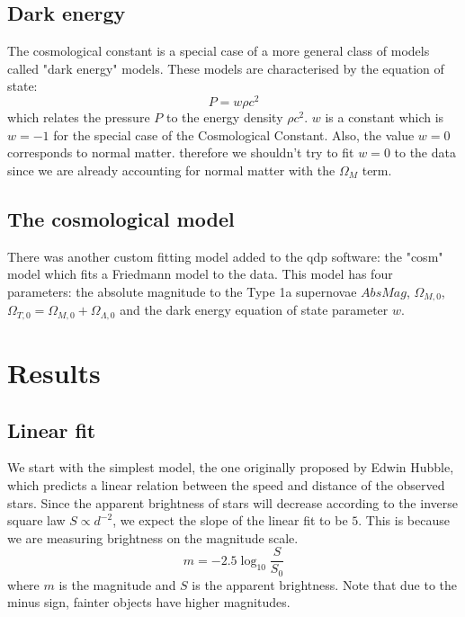 \documentclass[11pt]{article}
\begin{document}
\subsection{Dark energy}
The cosmological constant is a special case of a more general class of models called "dark energy" models. These models are characterised by the equation of state:
\begin{equation}
	P = w \rho c^2
	\label{eq:dark}
\end{equation}
which relates the pressure $P$ to the energy density $\rho c^2$. $w$ is a constant which is $w = -1$ for the special case of the Cosmological Constant. Also, the value $w = 0$ corresponds to normal matter. therefore we shouldn't try to fit $w = 0$ to the data since we are already accounting for normal matter with the $\Omega_M$ term. 

\subsection{The cosmological model}
There was another custom fitting model added to the qdp software: the "cosm" model which fits a Friedmann model to the data. This model has four parameters: the absolute magnitude to the Type 1a supernovae $AbsMag$, $\Omega_{M,0}$, $\Omega_{T,0} = \Omega_{M,0} + \Omega_{\Lambda,0}$ and the dark energy equation of state parameter $w$.

\section{Results}
\subsection{Linear fit}
We start with the simplest model, the one originally proposed by Edwin Hubble, which predicts a linear relation between the speed and distance of the observed stars. Since the apparent brightness of stars will decrease according to the inverse square law $S \propto d^{-2}$, we expect the slope of the linear fit to be $5$. This is because we are measuring brightness on the magnitude scale.
\begin{equation}
	m = -2.5\log_{10}\frac{S}{S_0}
	\label{eq:mag}
\end{equation}
where $m$ is the magnitude and  $S$ is the apparent brightness. Note that due to the minus sign, fainter objects have higher magnitudes. 
\end{document}
